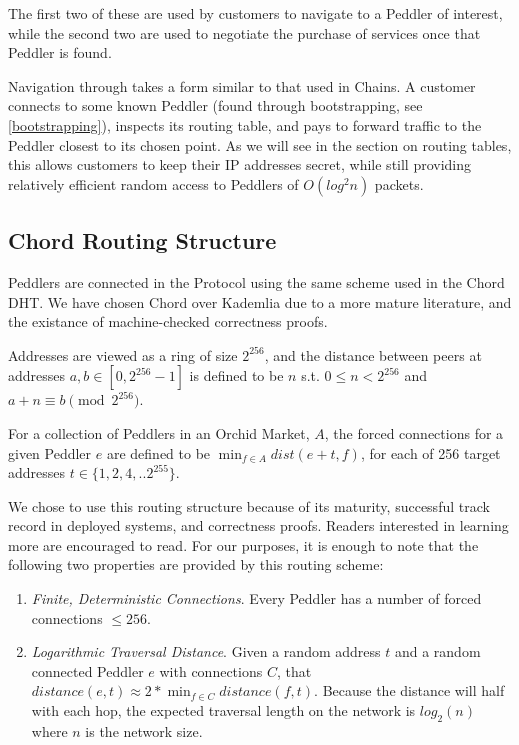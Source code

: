 The first two of these are used by customers to navigate to a Peddler
of interest, while the second two are used to negotiate the purchase
of services once that Peddler is found.

Navigation through \tOM{} takes a form similar to that used in
Chains. A customer connects to some known Peddler (found through
bootstrapping, see \ref{bootstrapping}), inspects its routing table,
and pays to forward traffic to the Peddler closest to its chosen
point. As we will see in the section on routing tables, this allows
customers to keep their IP addresses secret, while still providing
relatively efficient random access to Peddlers of $O(log^2 n)$ packets.

\subsection{Chord Routing Structure}


Peddlers are connected in the \Orchid{} Protocol using the same scheme
used in the Chord DHT. We have chosen Chord over Kademlia due to a
more mature literature, and the existance of machine-checked
correctness proofs\cite{ChordCorrect}.

Addresses are viewed as a ring of size $2^{256}$, and the distance
between peers at addresses $a, b \in [0, 2^{256}-1]$ is defined to be
$n$ s.t. $0 \leq n < 2^{256}$ and $a + n \equiv b \pmod{2^{256}}$.

For a collection of Peddlers in an Orchid Market, $A$, the forced
connections for a given Peddler $e$ are defined to be $\min_{f \in A}
dist(e+t, f)$, for each of 256 target addresses $t \in \{1, 2, 4,
.. 2^{255}\}$.

We chose to use this routing structure because of its maturity,
successful track record in deployed systems, and correctness
proofs. Readers interested in learning more are encouraged to
read\cite{CHORD}. For our purposes, it is enough to note that the
following two properties are provided by this routing scheme:

\begin{enumerate}
\item \emph{Finite, Deterministic Connections}. Every Peddler has a
  number of forced connections $\leq 256$.
\item \emph{Logarithmic Traversal Distance}. Given a random address
  $t$ and a random connected Peddler $e$ with connections $C$, that
  $distance(e, t) \approx 2 * \min_{f \in C} distance(f, t)$. Because
  the distance will half with each hop, the expected traversal length
  on the network is $log_2(n)$ where $n$ is the network size.
\end{enumerate}

